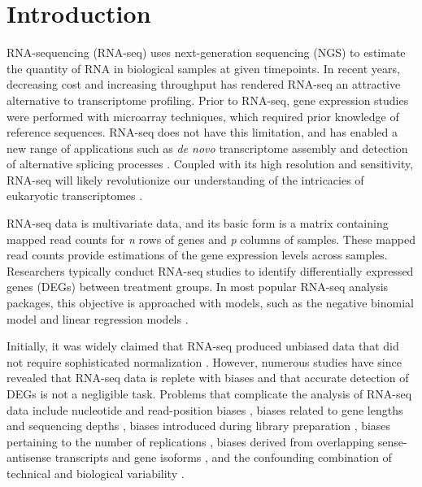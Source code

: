 \documentclass{bioinfo}
\begin{document}
\maketitle

\section{Introduction}

RNA-sequencing (RNA-seq) uses next-generation sequencing (NGS) to estimate the quantity of RNA in biological samples at given timepoints. In recent years, decreasing cost and increasing throughput has rendered RNA-seq an attractive alternative to transcriptome profiling. Prior to RNA-seq, gene expression studies were performed with microarray techniques, which required prior knowledge of reference sequences. RNA-seq does not have this limitation, and has enabled a new range of applications such as \textit{de novo} transcriptome assembly \citep{Robertson} and detection of alternative splicing processes \citep{Anders2012, Pan}. Coupled with its high resolution and sensitivity, RNA-seq will likely revolutionize our understanding of the intricacies of eukaryotic transcriptomes \citep{Wang, Zhao}.

RNA-seq data is multivariate data, and its basic form is a matrix containing mapped read counts for \textit{n} rows of genes and \textit{p} columns of samples. These mapped read counts provide estimations of the gene expression levels across samples. Researchers typically conduct RNA-seq studies to identify differentially expressed genes (DEGs) between treatment groups. In most popular RNA-seq analysis packages, this objective is approached with models, such as the negative binomial model \citep{Anders2010, Trapnell2012, Trapnell2013, Robinson} and linear regression models \citep{Law}.

Initially, it was widely claimed that RNA-seq produced unbiased data that did not require sophisticated normalization \citep{Wang, Morin, Marioni}. However, numerous studies have since revealed that RNA-seq data is replete with biases and that accurate detection of DEGs is not a negligible task. Problems that complicate the analysis of RNA-seq data include nucleotide and read-position biases \citep{Hansen}, biases related to gene lengths and sequencing depths \citep{Oshlack, RobinsonOshlack}, biases introduced during library preparation \citep{McIntyre}, biases pertaining to the number of replications \citep{Schurch}, biases derived from overlapping sense-antisense transcripts and gene isoforms \citep{Trapnell2013}, and the confounding combination of technical and biological variability \citep{Bullard}.
\end{document}
